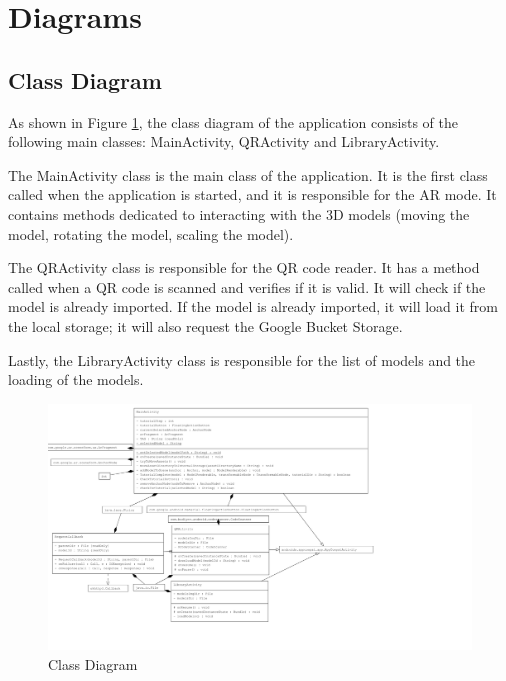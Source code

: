 \clearpage

\section{Diagrams}
\subsection*{Class Diagram}
As shown in Figure \ref{fig:ClassDiagram}, the class diagram of the application consists of the following main classes: MainActivity, QRActivity and LibraryActivity.

The MainActivity class is the main class of the application. It is the first class called when the application is started, and it is responsible for the \ac{AR} mode. It contains methods dedicated to interacting with the \ac{3D} models (moving the model, rotating the model, scaling the model).

The QRActivity class is responsible for the \ac{QR} code reader. It has a method called when a \ac{QR} code is scanned and verifies if it is valid. It will check if the model is already imported. If the model is already imported, it will load it from the local storage; it will also request the Google Bucket Storage.

Lastly, the LibraryActivity class is responsible for the list of models and the loading of the models.
\begin{figure}[ht]
    \centering
    \includegraphics[height=0.9\textwidth]{img/ClassDiagram.png}
    \caption{Class Diagram}
    \label{fig:ClassDiagram}
\end{figure}


